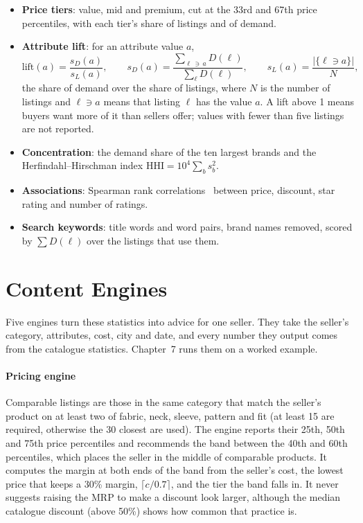 \begin{itemize}
\item \textbf{Price tiers}: value, mid and premium, cut at the 33rd and 67th price percentiles, with each tier's share of listings and of demand.
\item \textbf{Attribute lift}: for an attribute value $a$,
\begin{equation}
\text{lift}(a) = \frac{s_D(a)}{s_L(a)}, \qquad s_D(a) = \frac{\sum_{\ell \,\ni\, a} D(\ell)}{\sum_{\ell} D(\ell)}, \qquad s_L(a) = \frac{\left|\{\ell \ni a\}\right|}{N},
\end{equation}
the share of demand over the share of listings, where $N$ is the number of listings and $\ell \ni a$ means that listing $\ell$ has the value $a$. A lift above 1 means buyers want more of it than sellers offer; values with fewer than five listings are not reported.
\item \textbf{Concentration}: the demand share of the ten largest brands and the Herfindahl--Hirschman index $\mathrm{HHI} = 10^4 \sum_b s_b^2$.
\item \textbf{Associations}: Spearman rank correlations~\cite{spearman} between price, discount, star rating and number of ratings.
\item \textbf{Search keywords}: title words and word pairs, brand names removed, scored by $\sum D(\ell)$ over the listings that use them.
\end{itemize}

\section{Content Engines}
\label{sec:engines}

Five engines turn these statistics into advice for one seller. They take the seller's category, attributes, cost, city and date, and every number they output comes from the catalogue statistics. Chapter~7 runs them on a worked example.

\paragraph{Pricing engine} Comparable listings are those in the same category that match the seller's product on at least two of fabric, neck, sleeve, pattern and fit (at least 15 are required, otherwise the 30 closest are used). The engine reports their 25th, 50th and 75th price percentiles and recommends the band between the 40th and 60th percentiles, which places the seller in the middle of comparable products. It computes the margin at both ends of the band from the seller's cost, the lowest price that keeps a 30\% margin, $\lceil c / 0.7 \rceil$, and the tier the band falls in. It never suggests raising the MRP to make a discount look larger, although the median catalogue discount (above 50\%) shows how common that practice is.

